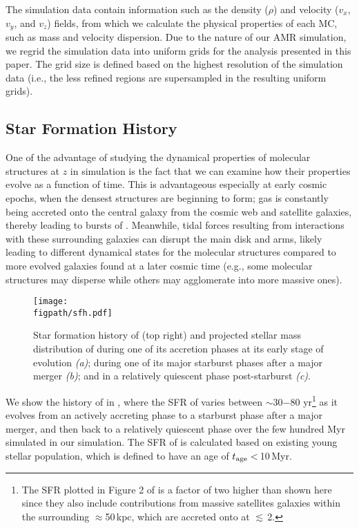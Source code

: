 \IfFileExists{emulateapjlegacy.cls}{\documentclass[iop]{emulateapjlegacy}}{\documentclass[iop]{emulateapj}}
\newcommand{\AP}[1]{({\bf \color{apcolor} AP: #1})}
\newcommand{\DL}[1]{({\bf \color{dlcolor} DL: #1})}
\begin{document}
The simulation data contain information such as the density ($\rho$) and velocity ($v_x$, $v_y$, and $v_z$) fields, from which we calculate 
the physical properties of each MC, such as mass and velocity dispersion.
Due to the nature of our AMR simulation, we regrid the simulation data into uniform grids for the analysis presented in this paper. 
The grid size is defined 
based on the highest resolution of the simulation data (i.e., the less refined regions are supersampled in the resulting uniform grids). 



\subsection{Star Formation History} \label{sec:sfh}
One of the advantage of studying the dynamical properties of molecular structures at
$z$ in simulation is the fact that we can examine how their properties evolve
as a function of time.
This is advantageous especially at early cosmic epochs,
when the densest structures are beginning to form;
gas is constantly being accreted onto the central galaxy from the cosmic web and
satellite galaxies, thereby leading to bursts of \SF.
Meanwhile, tidal forces resulting from interactions with these surrounding
galaxies can disrupt the main disk and arms, likely leading to different dynamical states
for the molecular structures compared to more evolved galaxies found at 
a later cosmic time (e.g., some molecular structures may disperse while others may agglomerate into more massive
ones). %

\begin{figure*}[!htbp]
\centering
\texttt{[image: \\figpath/sfh.pdf]}
\caption{
	Star formation history of \flower (top right) and
	projected stellar mass distribution of \flower during one of its accretion phases
	at its early stage of evolution {\it (a)}; during one of its major starburst phases
	after a major merger {\it (b)}; and in a relatively quiescent phase post-starburst {\it (c)}.
\label{fig:SFH}}
\end{figure*}


We show the \SF history of \flower in , where
the SFR of \flower varies between $\sim$30$-$80\,\Msun\,yr\pmOne\footnote{
The SFR plotted in Figure 2 of \citet{Pallottini17b}
is a factor of two higher than shown here since they also include contributions from
massive satellites galaxies within the surrounding $\approx$50\,kpc, which
are accreted onto \flower at \z$\lesssim$\,2.}
as it evolves from an actively accreting phase to
a starburst phase after a major merger, and then back to a relatively quiescent phase
over the few hundred Myr simulated in our simulation.
The SFR of \flower is calculated based on existing young stellar population, which is
defined to have an age of $t_{\rm age}<$\,10\,Myr.
\end{document}
